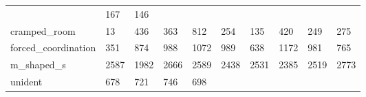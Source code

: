 \begin{table}[t]
\begin{center}
\begin{tabular}{llllllllll}
           & 167
        
           & 146
         \\

        cramped\_room
        
           & 13
        
           & 436
        
           & 363
        
           & 812
        
           & 254
        
           & 135
        
           & 420
        
           & 249
        
           & 275
         \\

        forced\_coordination
        
           & 351
        
           & 874
        
           & 988
        
           & 1072
        
           & 989
        
           & 638
        
           & 1172
        
           & 981
        
           & 765
         \\

        m\_shaped\_s
        
           & 2587
        
           & 1982
        
           & 2666
        
           & 2589
        
           & 2438
        
           & 2531
        
           & 2385
        
           & 2519
        
           & 2773
         \\

        unident
        
           & 678
        
           & 721
        
           & 746
        
           & 698
        

\end{tabular}
\end{center}
\end{table}
